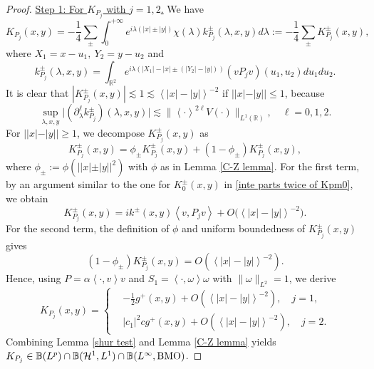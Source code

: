 \documentclass[reqno]{amsart}
\newcommand\R{\mathbb{R}}
\newcommand\B{\mathbb{B}}
\newcommand\HH{\mathcal{H}}
\numberwithin{equation}{section}
\begin{document}
\begin{proof}
\underline{Step 1: For $K_{P_j}$ with $j=1,2$.} We have 
\begin{equation*}
K_{{P_j}}(x,y)
=-\frac{1}{4}\sum\limits_{\pm}
\int_{0}^{+\infty}e^{i\lambda(|x|\pm|y|)}\chi(\lambda)k^{\pm}_{{P_j}}(\lambda,x,y)d\lambda:=-\frac{1}{4}\sum\limits_{\pm}K^{\pm}_{{P_j}}(x,y),
\end{equation*}
where $X_1=x-u_1,\ Y_2=y-u_2$ and
\begin{equation*}
k^{\pm}_{{P_j}}(\lambda,x,y)=\int_{\R^2}e^{i\lambda(|X_1|-|x|\pm(|Y_2|-|y|))}(v {P_j}v)(u_1,u_2)du_1du_2.
\end{equation*}
It is clear that $|K^{\pm}_{{P_j}}(x,y)|\lesssim 1\lesssim \left<|x|-|y|\right>^{-2}$ if $||x|-|y||\leq1$, because
\begin{equation*}
\sup_{\lambda,x,y}\big|(\partial^{\ell}_{\lambda}k^{\pm}_{{P_j}})(\lambda,x,y)\big|\lesssim\big\|\left<\cdot\right>^{2\ell}V(\cdot)\big\|_{L^1(\R)},\quad \ell=0,1,2.
\end{equation*}
For $||x|-|y||\geq1$, we decompose $K^{\pm}_{P_j}(x,y)$ as 
\begin{equation*}
K^{\pm}_{P_j}(x,y)=\phi_{\pm}K^{\pm}_{P_j}(x,y)+(1-\phi_{\pm})K^{\pm}_{P_j}(x,y),
\end{equation*}
where $\phi_{\pm}:=\phi\left(||x|\pm|y||^2\right)$ with $\phi$ as in Lemma \ref{C-Z lemma}. 
For the first term, by an  argument similar to the one for $K^{\pm}_0(x,y)$ in \eqref{inte parts twice of Kpm0}, we obtain
\begin{equation*}
K^{\pm}_{P_j}(x,y)=ik^{\pm}(x,y)\left<v,{P_j}v\right>+O\big(\left<|x|-|y|\right>^{-2}\big).
\end{equation*}
For the second term, the definition of $\phi$ and uniform boundedness of $K^{\pm}_{P_j}(x,y)$ gives
\begin{equation*}
(1-\phi_{\pm})K^{\pm}_{P_j}(x,y)=O(\left<|x|-|y|\right>^{-2}).
\end{equation*}
Hence, using $P=\alpha\left<\cdot,v\right>v$ and $S_1=\left<\cdot,\omega\right>\omega$ with $\|\omega\|_{L^2}=1$, we derive
\begin{equation}\label{kernel of KPj}
K_{P_j}(x,y)=\left\{\begin{aligned}
&-\frac{1}{2}g^+(x,y)+O(\left<|x|-|y|\right>^{-2}),\quad j=1,\\
&|c_1|^2cg^+(x,y)+O(\left<|x|-|y|\right>^{-2}), \quad j=2.
\end{aligned}\right.
\end{equation}
Combining Lemma \ref{shur test} and Lemma \ref{C-Z lemma} yields $K_{P_j}\in\B(L^p)\cap\B(\HH^1,L^1)\cap\B(L^{\infty},{\rm BMO})$.

\end{proof}
\end{document}
